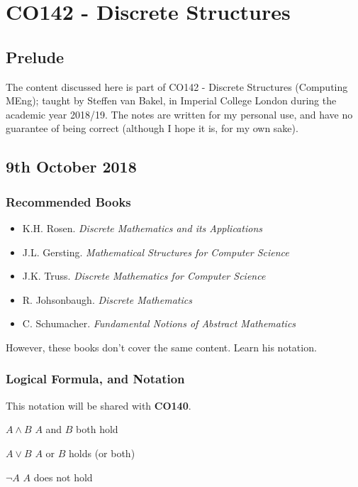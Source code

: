 \documentclass[a4paper, 12pt]{article}
\begin{document}
    \section*{CO142 - Discrete Structures}
        \subsection*{Prelude}
            The content discussed here is part of CO142 - Discrete Structures (Computing MEng); taught by Steffen van Bakel, in Imperial College London during the academic year 2018/19. The notes are written for my personal use, and have no guarantee of being correct (although I hope it is, for my own sake).
        \subsection*{9th October 2018}
            \subsubsection*{Recommended Books}
                \begin{itemize}
                    \item K.H. Rosen. \textit{Discrete Mathematics and its Applications}
                    \item J.L. Gersting. \textit{Mathematical Structures for Computer Science}
                    \item J.K. Truss. \textit{Discrete Mathematics for Computer Science}
                    \item R. Johsonbaugh. \textit{Discrete Mathematics}
                    \item C. Schumacher. \textit{Fundamental Notions of Abstract Mathematics}
                \end{itemize}
                However, these books don't cover the same content. Learn his notation.
            \subsubsection*{Logical Formula, and Notation}
                This notation will be shared with \textbf{CO140}.
                \medskip

                $A \land B$ \hfill $A$ and $B$ both hold
                \smallskip

                $A \lor B$ \hfill $A$ or $B$ holds (or both)
                \smallskip

                $\neg A$ \hfill $A$ does not hold
                \smallskip
\end{document}
